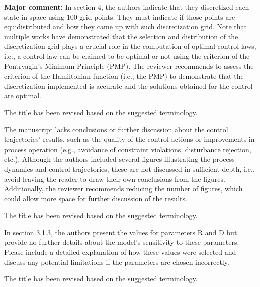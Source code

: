 \documentclass[10pt,answers]{exam}
\begin{document}
\begin{questions}

    \question \textbf{Major comment: } In section 4, the authors indicate that they discretized each state in space using 100 grid points. They must indicate if those points are equidistributed and how they came up with such discretization grid. Note that multiple works \cite{palma2023selection, assassa2016optimality, chen2014bilevel} have demonstrated that the selection and distribution of the discretization grid plays a crucial role in the computation of optimal control laws, i.e., a control law can be claimed to be optimal or not using the criterion of the Pontryagin's Minimum Principle (PMP). The reviewer recommends to assess the criterion of the Hamiltonian function (i.e., the PMP) to demonstrate that the discretization implemented is accurate and the solutions obtained for the control are optimal.

    \begin{solutionorbox}
        The title has been revised based on the suggested terminology.
    \end{solutionorbox}


    \question The manuscript lacks conclusions or further discussion about the control trajectories' results, such as the quality of the control actions or improvements in process operation (e.g., avoidance of constraint violations, disturbance rejection, etc.). Although the authors included several figures illustrating the process dynamics and control trajectories, these are not discussed in sufficient depth, i.e., avoid leaving the reader to draw their own conclusions from the figures. Additionally, the reviewer recommends reducing the number of figures, which could allow more space for further discussion of the results.

    \begin{solutionorbox}
        The title has been revised based on the suggested terminology.
    \end{solutionorbox}


    \question In section 3.1.3, the authors present the values for parameters R and D but provide no further details about the model's sensitivity to these parameters. Please include a detailed explanation of how these values were selected and discuss any potential limitations if the parameters are chosen incorrectly.

    \begin{solutionorbox}
        The title has been revised based on the suggested terminology.
    \end{solutionorbox}



\end{questions}
\end{document}
